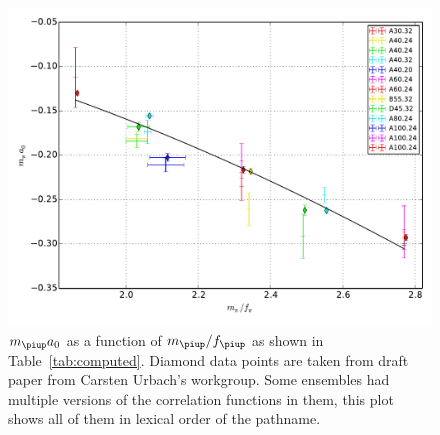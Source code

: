 \documentclass[11pt, english, fleqn, DIV=10, headinclude]{scrartcl}
\newcommand\mpi{m_{\piup}}
\begin{document}
\begin{figure}[htbp]
    \centering
    \includegraphics[width=\linewidth]{plots/result.pdf}
    \caption{%
        $\mpi a_0$ as a function of $\mpi/f_\piup$ as shown in
        Table~\ref{tab:computed}. Diamond data points are taken from draft
        paper from Carsten Urbach's workgroup. Some ensembles had multiple
        versions of the correlation functions in them, this plot shows all of
        them in lexical order of the pathname.
    }
    \label{fig:result}
\end{figure}
\end{document}
